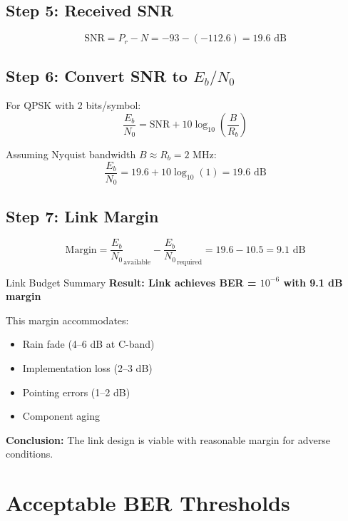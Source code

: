 \subsection*{Step 5: Received SNR}

\begin{equation}
\mathrm{SNR} = P_r - N = -93 - (-112.6) = 19.6 \text{ dB}
\end{equation}

\subsection*{Step 6: Convert SNR to $E_b/N_0$}

For QPSK with 2 bits/symbol:
\begin{equation}
\frac{E_b}{N_0} = \mathrm{SNR} + 10\log_{10}\left(\frac{B}{R_b}\right)
\end{equation}

Assuming Nyquist bandwidth $B \approx R_b = 2$ MHz:
\begin{equation}
\frac{E_b}{N_0} = 19.6 + 10\log_{10}(1) = 19.6 \text{ dB}
\end{equation}

\subsection*{Step 7: Link Margin}

\begin{equation}
\text{Margin} = \frac{E_b}{N_0}_{\text{available}} - \frac{E_b}{N_0}_{\text{required}} = 19.6 - 10.5 = 9.1 \text{ dB}
\end{equation}

\begin{calloutbox}[colback=black!8!white,colframe=black]{Link Budget Summary}
\textbf{Result: Link achieves BER = $10^{-6}$ with 9.1 dB margin}

This margin accommodates:
\begin{itemize}
\item Rain fade (4--6 dB at C-band)
\item Implementation loss (2--3 dB)
\item Pointing errors (1--2 dB)
\item Component aging
\end{itemize}

\textbf{Conclusion:} The link design is viable with reasonable margin for adverse conditions.
\end{calloutbox}

\section{Acceptable BER Thresholds}

